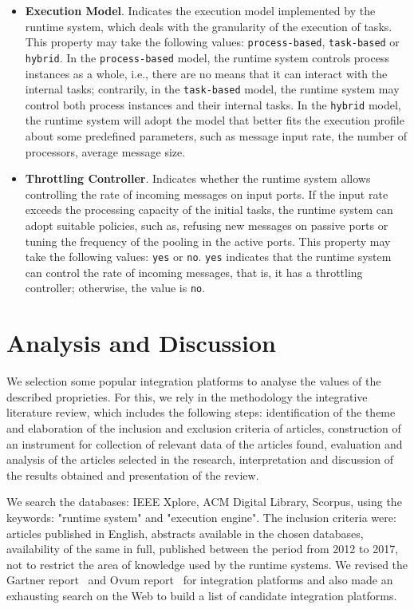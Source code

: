 \begin{itemize}
%
\item \textbf{Execution Model}. Indicates the execution model implemented by the runtime system, which deals with the granularity of the execution of tasks. This property may take the following values: \texttt{process-based}, \texttt{task-based} or \texttt{hybrid}. In the \texttt{process-based} model, the runtime system controls process instances as a whole, i.e., there are no means that it can interact with the internal tasks; contrarily, in the \texttt{task-based} model, the runtime system may control both process instances and their internal tasks. In the \texttt{hybrid} model, the runtime system will adopt the model that better fits the execution profile about some predefined parameters, such as message input rate, the number of processors, average message size. 
%
\item \textbf{Throttling Controller}. Indicates whether the runtime system allows controlling the rate of incoming messages on input ports. If the input rate exceeds the processing capacity of the initial tasks, the runtime system can adopt suitable policies, such as, refusing new messages on passive ports or tuning the frequency of the pooling in the active ports. This property may take the following values: \texttt{yes} or \texttt{no}. \texttt{yes} indicates that the runtime system can control the rate of incoming messages, that is, it has a throttling controller; otherwise, the value is \texttt{no}. 
\end{itemize}
\section{Analysis and Discussion}
\label{sec:analysis}

We selection some popular integration platforms to analyse the values of the described proprieties. For this, we rely in the methodology the integrative literature review, which includes the following steps: identification of the theme and elaboration of the inclusion and exclusion criteria of articles, construction of an instrument for collection of relevant data of the articles found, evaluation and analysis of the articles selected in the research, interpretation and discussion of the results obtained and presentation of the review.

We search the databases: IEEE Xplore, ACM Digital Library, Scorpus, using the keywords: "runtime system" and "execution engine". The inclusion criteria were: articles published in English, abstracts available in the chosen databases, availability of the same in full, published between the period from 2012 to 2017, not to restrict the area of knowledge used by the runtime systems.
We revised the Gartner report~\cite{gartner2016,guttridge2017} and Ovum report~\cite{sharma2017} for integration platforms and also made an exhausting search on the Web to build a list of candidate integration platforms. 

